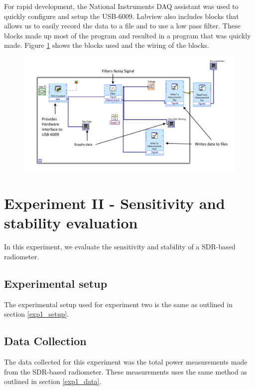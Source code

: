 For rapid development, the National Instruments DAQ assistant was used to quickly configure and setup the USB-6009.  Labview also includes blocks that allows us to easily record the data to a file and to use a low pass filter.  These blocks made up most of the program and resulted in a program that was quickly made.  Figure \ref{labviewblock} shows the blocks used and the wiring of the blocks.

{\begin{figure}[h!tb] \centering
\includegraphics[width=\textwidth]{Images/labview_diagram.pdf}
\label{labviewblock}
\end{figure}
}

\section{Experiment II - Sensitivity and stability evaluation}\label{Exp2}

In this experiment, we evaluate the sensitivity and stability of a SDR-based radiometer.    

\subsection{Experimental setup} \label{exp2_setup}
The experimental setup used for experiment two is the same as outlined in section \ref{exp1_setup}.  

\subsection{Data Collection}
The data collected for this experiment was the total power measurements made from the SDR-based radiometer.  These measurements uses the same method as outlined in section \ref{exp1_data}.

